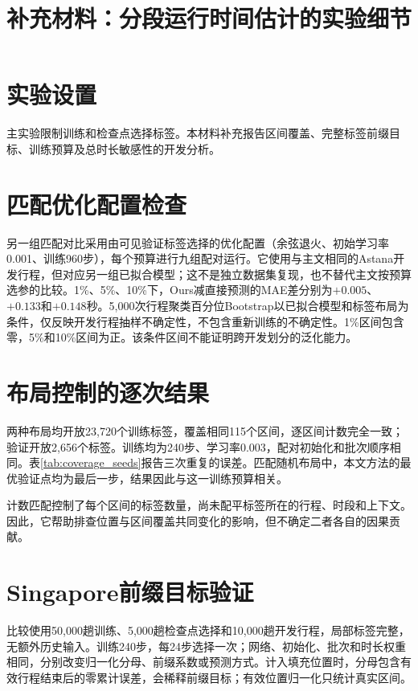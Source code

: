 \documentclass[journal]{IEEEtran}
\begin{document}
\title{补充材料：分段运行时间估计的实验细节}
\author{}
\maketitle
\section{实验设置}
主实验限制训练和检查点选择标签。本材料补充报告区间覆盖、完整标签前缀目标、训练预算及总时长敏感性的开发分析。

\section{匹配优化配置检查}

另一组匹配对比采用由可见验证标签选择的优化配置（余弦退火、初始学习率0.001、训练960步），每个预算进行九组配对运行。它使用与主文相同的Astana开发行程，但对应另一组已拟合模型；这不是独立数据集复现，也不替代主文按预算选参的比较。1\%、5\%、10\%下，Ours减直接预测的MAE差分别为$+0.005$、$+0.133$和$+0.148$秒。5,000次行程聚类百分位Bootstrap以已拟合模型和标签布局为条件，仅反映开发行程抽样不确定性，不包含重新训练的不确定性。1\%区间包含零，5\%和10\%区间为正。该条件区间不能证明跨开发划分的泛化能力。

\section{布局控制的逐次结果}

两种布局均开放23,720个训练标签，覆盖相同115个区间，逐区间计数完全一致；验证开放2,656个标签。训练均为240步、学习率0.003，配对初始化和批次顺序相同。表\ref{tab:coverage_seeds}报告三次重复的误差。匹配随机布局中，本文方法的最优验证点均为最后一步，结果因此与这一训练预算相关。

计数匹配控制了每个区间的标签数量，尚未配平标签所在的行程、时段和上下文。因此，它帮助排查位置与区间覆盖共同变化的影响，但不确定二者各自的因果贡献。

\section{Singapore前缀目标验证}


比较使用50,000趟训练、5,000趟检查点选择和10,000趟开发行程，局部标签完整，无额外历史输入。训练240步，每24步选择一次；网络、初始化、批次和时长权重相同，分别改变归一化分母、前缀系数或预测方式。计入填充位置时，分母包含有效行程结束后的零累计误差，会稀释前缀目标；有效位置归一化只统计真实区间。
\end{document}
